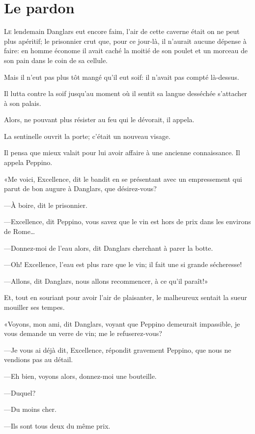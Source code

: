 \chapter{Le pardon}

\lettrine{L}{e} lendemain Danglars eut encore faim, l'air de cette caverne était on ne peut plus apéritif; le prisonnier crut que, pour ce jour-là, il n'aurait aucune dépense à faire: en homme économe il avait caché la moitié de son poulet et un morceau de son pain dans le coin de sa cellule. 

Mais il n'eut pas plus tôt mangé qu'il eut soif: il n'avait pas compté là-dessus. 

Il lutta contre la soif jusqu'au moment où il sentit sa langue desséchée s'attacher à son palais. 

Alors, ne pouvant plus résister au feu qui le dévorait, il appela. 

La sentinelle ouvrit la porte; c'était un nouveau visage. 

Il pensa que mieux valait pour lui avoir affaire à une ancienne connaissance. Il appela Peppino. 

«Me voici, Excellence, dit le bandit en se présentant avec un empressement qui parut de bon augure à Danglars, que désirez-vous? 

—À boire, dit le prisonnier. 

—Excellence, dit Peppino, vous savez que le vin est hors de prix dans les environs de Rome\dots 

—Donnez-moi de l'eau alors, dit Danglars cherchant à parer la botte. 

—Oh! Excellence, l'eau est plus rare que le vin; il fait une si grande sécheresse! 

—Allons, dit Danglars, nous allons recommencer, à ce qu'il paraît!» 

Et, tout en souriant pour avoir l'air de plaisanter, le malheureux sentait la sueur mouiller ses tempes. 

«Voyons, mon ami, dit Danglars, voyant que Peppino demeurait impassible, je vous demande un verre de vin; me le refuserez-vous? 

—Je vous ai déjà dit, Excellence, répondit gravement Peppino, que nous ne vendions pas au détail. 

—Eh bien, voyons alors, donnez-moi une bouteille. 

—Duquel? 

—Du moins cher. 

—Ils sont tous deux du même prix. 

